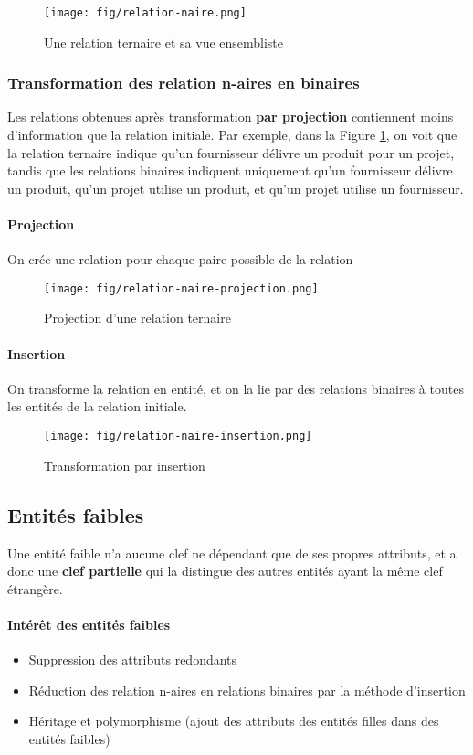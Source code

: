\documentclass[a4paper]{article}
\begin{document}
\begin{figure}[H]
    \center
    \texttt{[image: fig/relation-naire.png]}
    \caption{Une relation ternaire et sa vue ensembliste}
\end{figure}

\subsubsection{Transformation des relation n-aires en binaires}
Les relations obtenues après transformation \textbf{par projection} contiennent moins d'information
que la relation initiale. Par exemple, dans la Figure \ref{fig:relation-naire-projection},
on voit que la relation ternaire indique qu'un fournisseur délivre un produit pour un projet,
tandis que les relations binaires indiquent uniquement qu'un fournisseur délivre un produit,
qu'un projet utilise un produit, et qu'un projet utilise un fournisseur.

\paragraph{Projection}
On crée une relation pour chaque paire possible de la relation
\begin{figure}[H]
    \center
    \texttt{[image: fig/relation-naire-projection.png]}
    \caption{\label{fig:relation-naire-projection}Projection d'une relation ternaire}
\end{figure}

\paragraph{Insertion}
On transforme la relation en entité, et on la lie par des relations binaires à
toutes les entités de la relation initiale.
\begin{figure}[H]
    \center
    \texttt{[image: fig/relation-naire-insertion.png]}
    \caption{Transformation par insertion}
\end{figure}

\subsection{Entités faibles}
Une entité faible n'a aucune clef ne dépendant que de ses propres attributs, et
a donc une \textbf{clef partielle} qui la distingue des autres entités ayant la
même clef étrangère.

\paragraph{Intérêt des entités faibles}
\begin{itemize}
  \item Suppression des attributs redondants
  \item Réduction des relation n-aires en relations binaires par la méthode d'insertion
  \item Héritage et polymorphisme (ajout des attributs des entités filles dans des entités faibles)
\end{itemize}
\end{document}
